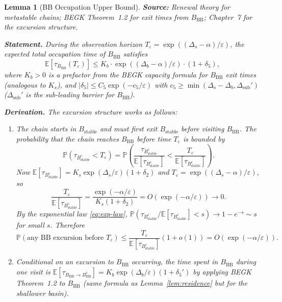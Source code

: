 \documentclass[11pt]{article}
\newtheorem{lemma}{Lemma}
\newcommand{\eps}{\varepsilon}
\newcommand{\Ds}{\Delta_s}
\newcommand{\Db}{\Delta_b}
\newcommand{\Bstable}{B_{\mathrm{stable}}}
\newcommand{\BBB}{B_{\mathrm{BB}}}
\newcommand{\Teps}{T_\eps}
\begin{document}
\begin{lemma}[BB Occupation Upper Bound]\label{lem:bb-upper}
\textbf{Source:} Renewal theory for metastable chains; BEGK
\cite{BEGK02} Theorem~1.2 for exit times from $\BBB$; \cite{BdH15}
Chapter~7 for the excursion structure.

\medskip
\textbf{Statement.}
During the observation horizon $\Teps = \exp((\Ds - \alpha)/\eps)$,
the expected total occupation time of $\BBB$ satisfies
\begin{equation}\label{eq:bb-occupation}
  \mathbb{E}[\tau_{\BBB}(\Teps)]
  \leq K_b \cdot \exp((\Db - \alpha)/\eps) \cdot (1 + \delta_5),
\end{equation}
where $K_b > 0$ is a prefactor from the BEGK capacity formula for
$\BBB$ exit times (analogous to $K_s$), and
$|\delta_5| \leq C_5 \exp(-c_5/\eps)$ with
$c_5 \geq \min(\Ds - \Db, \Delta_{\mathrm{sub}}')$ ($\Delta_{\mathrm{sub}}'$
is the sub-leading barrier for $\BBB$).

\medskip
\textbf{Derivation.}
The excursion structure works as follows:
\begin{enumerate}
\item The chain starts in $\Bstable$ and must first exit $\Bstable$
  before visiting $\BBB$. The probability that the chain reaches
  $\BBB$ before time $\Teps$ is bounded by
  \[
    \mathbb{P}(\tau_{\Bstable^c} < \Teps)
    = \mathbb{P}\!\left(\frac{\tau_{\Bstable^c}}
      {\mathbb{E}[\tau_{\Bstable^c}]}
      < \frac{\Teps}{\mathbb{E}[\tau_{\Bstable^c}]}\right).
  \]
  Now $\mathbb{E}[\tau_{\Bstable^c}] = K_s \exp(\Ds/\eps)(1+\delta_2)$
  and $\Teps = \exp((\Ds - \alpha)/\eps)$, so
  \[
    \frac{\Teps}{\mathbb{E}[\tau_{\Bstable^c}]}
    = \frac{\exp(-\alpha/\eps)}{K_s(1+\delta_2)}
    = O(\exp(-\alpha/\eps)) \to 0.
  \]
  By the exponential law \eqref{eq:exp-law},
  $\mathbb{P}(\tau_{\Bstable^c}/\mathbb{E}[\tau_{\Bstable^c}] < s)
  \to 1 - e^{-s} \sim s$ for small $s$. Therefore
  \begin{equation}\label{eq:excursion-prob}
    \mathbb{P}(\text{any BB excursion before } \Teps)
    \leq \frac{\Teps}{\mathbb{E}[\tau_{\Bstable^c}]}(1 + o(1))
    = O(\exp(-\alpha/\eps)).
  \end{equation}

\item Conditional on an excursion to $\BBB$ occurring, the time spent
  in $\BBB$ during one visit is
  $\mathbb{E}[\tau_{\BBB \to \BBB^c}] = K_b \exp(\Db/\eps)(1+\delta_5')$
  by applying BEGK Theorem~1.2 to $\BBB$ (same formula as
  Lemma~\ref{lem:residence} but for the shallower basin).


\end{enumerate}
\end{lemma}
\end{document}
